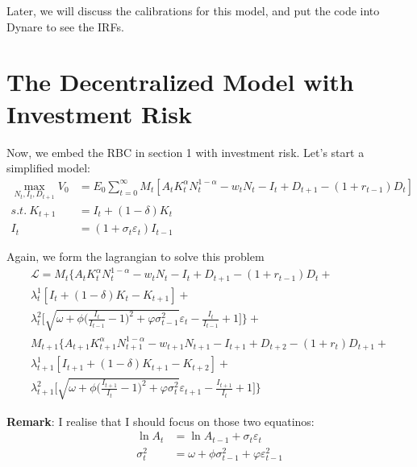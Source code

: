 \documentclass[12pt]{article}
\theoremstyle{definition}
\numberwithin{equation}{section}
\numberwithin{figure}{section}
\numberwithin{table}{section}
\begin{document}
Later, we will discuss the calibrations for this model, and put the code into Dynare to see the IRFs.

\newpage
\section{The Decentralized Model with Investment Risk}

Now, we embed the RBC in section 1 with investment risk. Let's start a simplified model:
\begin{align}
  \max_{N_t, I_t, D_{t+1}} V_0 & = E_0 \sum_{t=0}^\infty M_t [A_t K_t^\alpha N_t^{1-\alpha} - w_t N_t - I_t + D_{t+1} - (1+r_{t-1})D_t] \\
  s.t. \ K_{t+1} & = I_t + (1- \delta) K_t  \\
  I_t & = (1 + \sigma_t \varepsilon_t) I_{t-1}
\end{align}

Again, we form the lagrangian to solve this problem
\begin{gather*}
  \mathcal{L} = M_t \{ A_tK_t^\alpha N_t^{1-\alpha} - w_t N_t - I_t + D_{t+1} - (1+r_{t-1}) D_t + \\
  \lambda_t^1 [ I_t + (1-\delta)K_t - K_{t+1}] + \\
  \lambda_t^2 \big[\sqrt{\omega + \phi \big(\frac{I_t}{I_{t-1} } - 1\big)^2 + \varphi \sigma_{t-1}^2}\varepsilon_t - \frac{I_t}{I_{t-1}} + 1 \big] \} + \\
  M_{t+1} \{ A_{t+1}K_{t+1}^\alpha N_{t+1}^{1-\alpha} - w_{t+1} N_{t+1} - I_{t+1} + D_{t+2} - (1+r_{t}) D_{t+1} + \\
  \lambda_{t+1}^1 [ I_{t+1} + (1-\delta)K_{t+1} - K_{t+2}] + \\
  \lambda_{t+1}^2 \big[\sqrt{\omega + \phi \big(\frac{I_{t+1}}{I_{t} } - 1\big)^2 + \varphi \sigma_{t}^2}\varepsilon_{t+1} - \frac{I_{t+1}}{I_{t}} + 1 \big] \}
\end{gather*}


\textbf{Remark}: I realise that I should focus on those two equatinos:
\begin{align*}
  \ln A_t & = \ln A_{t-1} + \sigma_t \varepsilon_t \\
  \sigma_t^2 & = \omega + \phi \sigma_{t-1}^2 + \varphi \varepsilon_{t-1}^2
\end{align*}
















\newpage


\end{document}
